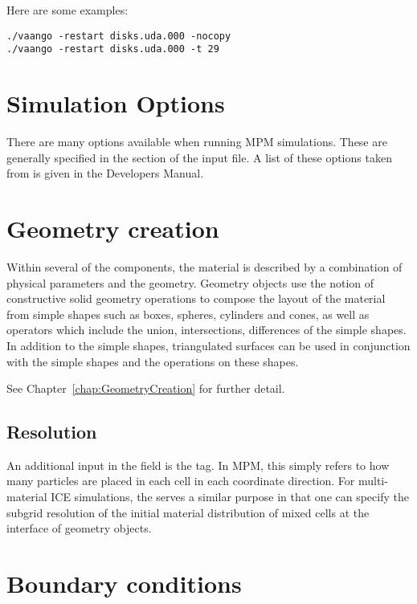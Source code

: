 Here are some examples:

\begin{lstlisting}[backgroundcolor=\color{background}]
./vaango -restart disks.uda.000 -nocopy
./vaango -restart disks.uda.000 -t 29
\end{lstlisting}
%

\section{Simulation Options} \label{Sec:SimulationOptions}


There are many options available when running MPM simulations.  These
are generally specified in the  section of the input file.
A list of these options taken from 
  is given in the \Vaango
Developers Manual.

\section{Geometry creation} 
Within several of the components, the material is described by a
combination of physical parameters and the geometry.  Geometry objects
use the notion of constructive solid geometry operations to compose
the layout of the material from simple shapes such as boxes, spheres,
cylinders and cones, as well as operators which include the union,
intersections, differences of the simple shapes.  In addition to the
simple shapes, triangulated surfaces can be used in conjunction with
the simple shapes and the operations on these shapes.  

See Chapter~\ref{chap:GeometryCreation} for further detail.

\subsection{Resolution}
An additional input in the  field is the
 tag.  In MPM, this simply refers to how many particles
are placed in each cell in each coordinate direction.  For multi-material ICE
simulations, the  serves a similar purpose in that one
can specify the subgrid resolution of the initial material distribution
of mixed cells at the interface of geometry objects.

\section{Boundary conditions}\label{sec:ucf_bc}

